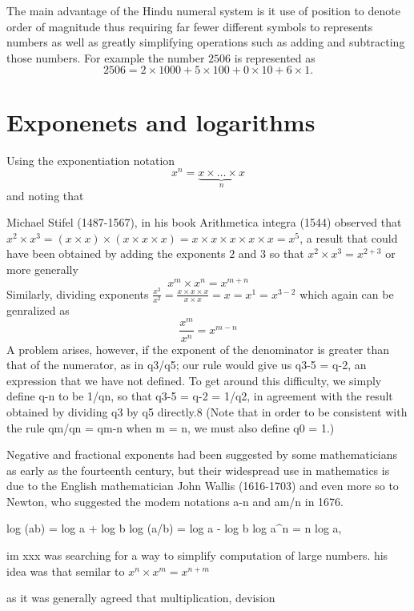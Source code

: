 The main advantage of the Hindu numeral system is it use of position to denote order of magnitude thus requiring far fewer different symbols to represents numbers as well as greatly simplifying operations such as adding and subtracting those numbers. For example the number $2506$ is represented as
\[
2506 = 2 \times 1000 + 5 \times 100 + 0 \times 10 + 6 \times 1.
\]

\section{Exponenets and logarithms}
Using the exponentiation notation
\[
x^n = \underbrace{x \times \dots \times x}_n
\]
and noting that

Michael Stifel (1487-1567), in his book Arithmetica integra (1544) observed that $x^2 \times x^3 = (x \times x) \times (x \times x \times x) = x \times x \times x \times x \times x = x^5$, a result that could have been obtained by adding the exponents $2$ and $3$ so that $x^2 \times x^3 = x^{2+3}$ or more generally
\[
x^m \times x^n = x^{m+n}
\]
Similarly, dividing exponents $\frac{x^3}{x^2} = \frac{x \times x \times x}{x \times x} = x = x^1 = x^{3-2}$ which again can be genralized as
\[
\frac{x^m}{x^n} = x^{m-n}
\]
A problem arises, however, if the exponent of the denominator is greater than that of the numerator, as in q3/q5; our rule would give us q3-5 = q-2, an expression that we have not defined. To get around this difficulty, we simply define q-n to be 1/qn, so that q3-5 = q-2 = 1/q2, in agreement with the result obtained by dividing q3 by q5 directly.8 (Note that in order to be consistent with the rule qm/qn = qm-n when m = n, we must also define q0 = 1.)

Negative and fractional exponents had been suggested by some mathematicians as early as the fourteenth century, but their widespread use in mathematics is due to the English mathematician John Wallis (1616-1703) and even more so to Newton, who suggested the modem notations a-n and am/n in 1676.


log (ab) = log a + log b
log (a/b) = log a - log b
log a^n = n log a,

im xxx was searching for a way to simplify computation of large numbers. his idea was that semilar to $x^n \times x^m = x^{n+m}$


 as it was generally agreed that multiplication, devision 

